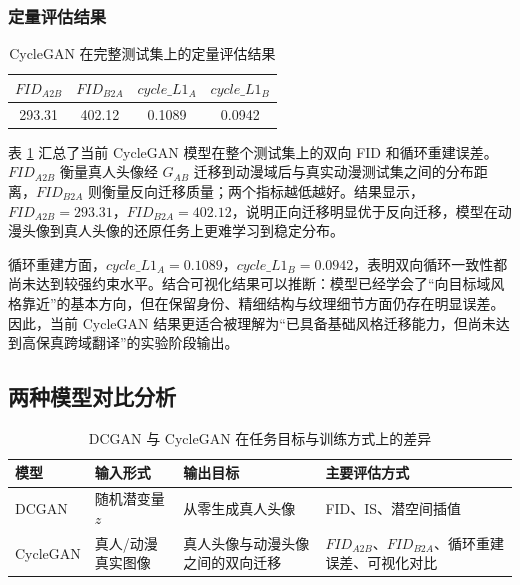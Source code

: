 \documentclass[12pt, a4paper, UTF8]{ctexart}
\begin{document}
\subsubsection{定量评估结果}
\begin{table}[H]
\centering
\caption{CycleGAN 在完整测试集上的定量评估结果}
\label{tab:cyclegan-metrics}
\begin{tabular}{cccc}
\toprule
$FID_{A2B}$ & $FID_{B2A}$ & $cycle\_L1_A$ & $cycle\_L1_B$ \\
\midrule
293.31 & 402.12 & 0.1089 & 0.0942 \\
\bottomrule
\end{tabular}
\end{table}

表 \ref{tab:cyclegan-metrics} 汇总了当前 CycleGAN 模型在整个测试集上的双向 FID 和循环重建误差。$FID_{A2B}$ 衡量真人头像经 $G_{AB}$ 迁移到动漫域后与真实动漫测试集之间的分布距离，$FID_{B2A}$ 则衡量反向迁移质量；两个指标越低越好。结果显示，$FID_{A2B}=293.31$，$FID_{B2A}=402.12$，说明正向迁移明显优于反向迁移，模型在动漫头像到真人头像的还原任务上更难学习到稳定分布。

循环重建方面，$cycle\_L1_A=0.1089$，$cycle\_L1_B=0.0942$，表明双向循环一致性都尚未达到较强约束水平。结合可视化结果可以推断：模型已经学会了“向目标域风格靠近”的基本方向，但在保留身份、精细结构与纹理细节方面仍存在明显误差。因此，当前 CycleGAN 结果更适合被理解为“已具备基础风格迁移能力，但尚未达到高保真跨域翻译”的实验阶段输出。

\subsection{两种模型对比分析}

\begin{table}[H]
\centering
\caption{DCGAN 与 CycleGAN 在任务目标与训练方式上的差异}
\label{tab:model-compare}
\begin{tabular}{>{\centering\arraybackslash}m{2.2cm} >{\centering\arraybackslash}m{3.2cm} >{\centering\arraybackslash}m{3.1cm} >{\centering\arraybackslash}m{4.8cm}}
\toprule
模型 & 输入形式 & 输出目标 & 主要评估方式 \\
\midrule
DCGAN & 随机潜变量 $z$ & 从零生成真人头像 & FID、IS、潜空间插值 \\
CycleGAN & 真人/动漫真实图像 & 真人头像与动漫头像之间的双向迁移 & $FID_{A2B}$、$FID_{B2A}$、循环重建误差、可视化对比 \\
\bottomrule
\end{tabular}
\end{table}
\end{document}
